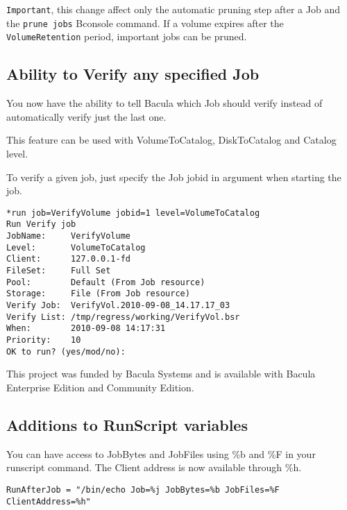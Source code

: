 \texttt{Important}, this change affect only the automatic pruning step after a
Job and the \texttt{prune jobs} Bconsole command. If a volume expires after the
\texttt{VolumeRetention} period, important jobs can be pruned.

\subsection{Ability to Verify any specified Job}
You now have the ability to tell Bacula which Job should verify instead of
automatically verify just the last one.

This feature can be used with VolumeToCatalog, DiskToCatalog and Catalog level.

To verify a given job, just specify the Job jobid in argument when starting the
job.
\begin{verbatim}
*run job=VerifyVolume jobid=1 level=VolumeToCatalog
Run Verify job
JobName:     VerifyVolume
Level:       VolumeToCatalog
Client:      127.0.0.1-fd
FileSet:     Full Set
Pool:        Default (From Job resource)
Storage:     File (From Job resource)
Verify Job:  VerifyVol.2010-09-08_14.17.17_03
Verify List: /tmp/regress/working/VerifyVol.bsr
When:        2010-09-08 14:17:31
Priority:    10
OK to run? (yes/mod/no):
\end{verbatim}

\medskip
This project was funded by Bacula Systems and is available with Bacula
Enterprise Edition and Community Edition.

\subsection{Additions to RunScript variables}
You can have access to JobBytes and JobFiles using \%b and \%F in your runscript
command. The Client address is now available through \%h.

\begin{verbatim}
RunAfterJob = "/bin/echo Job=%j JobBytes=%b JobFiles=%F ClientAddress=%h"
\end{verbatim}

%
%
%

